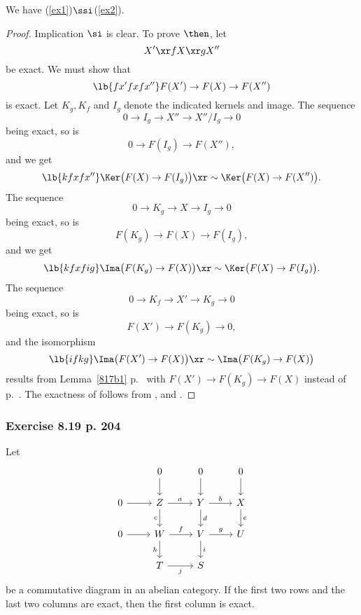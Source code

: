 \documentclass[12pt]{article}
\theoremstyle{remark}
\theoremstyle{definition}
\begin{document}
\begin{lem}
We have (\ref{ex1})$\ssi$(\ref{ex2}).
\end{lem}

\begin{proof}
Implication $\si$ is clear. To prove $\then$, let 
$$
X'\xr fX\xr gX''
$$
be exact. We must show that 
\begin{equation}\lb{fx'fxfx''}
F(X')\to F(X)\to F(X'')
\end{equation} 
is exact. Let $K_g,K_f$ and $I_g$ denote the indicated kernels and image. The sequence 
$$ 
0\to I_g\to X''\to X''/I_g\to 0
$$ 
being exact, so is 
$$ 
0\to F(I_g)\to F(X''), 
$$ 
and we get 
\begin{equation}\lb{kfxfx''}
\Ker\big(F(X)\to F(I_g)\big)\xr\sim\Ker\big(F(X)\to F(X'')\big). 
\end{equation} 
The sequence 
$$ 
0\to K_g\to X\to I_g\to 0
$$ 
being exact, so is 
$$ 
F(K_g)\to F(X)\to F(I_g), 
$$ 
and we get 
\begin{equation}\lb{kfxfig}
\Ima\big(F(K_g)\to F(X)\big)\xr\sim\Ker\big(F(X)\to F(I_g)\big). 
\end{equation} 
The sequence 
$$ 
0\to K_f\to X'\to K_g\to 0 
$$ 
being exact, so is 
$$ 
F(X')\to F(K_g)\to0,  
$$ 
and the isomorphism 
\begin{equation}\lb{ifkg}
\Ima\big(F(X')\to F(X)\big)\xr\sim\Ima\big(F(K_g)\to F(X)\big)  
\end{equation} 
results from Lemma~\ref{817b1} p.~ with $F(X')\to F(K_g)\to F(X)$ instead of  p.~. The exactness of  follows from ,  and .
\end{proof}


\subsubsection{Exercise 8.19 p. 204}

Let 
$$
\begin{tikzcd} 
&0\ar[d]&0\ar[d]&0\ar[d]\\ 
0\ar[r]&Z\ar[d,"c"']\ar[r,"a"]&Y\ar[d,"d"]\ar[r,"b"]&X\ar[d,"e"]\\ 
0\ar[r]&W\ar[d,"h"']\ar[r,"f"]&V\ar[d,"i"]\ar[r,"g"]&U\\ 
&T\ar[r,"j"']&S
\end{tikzcd}
$$ 
be a commutative diagram in an abelian category. If the first two rows and the last two columns are exact, then the first column is exact. 
\end{document}
